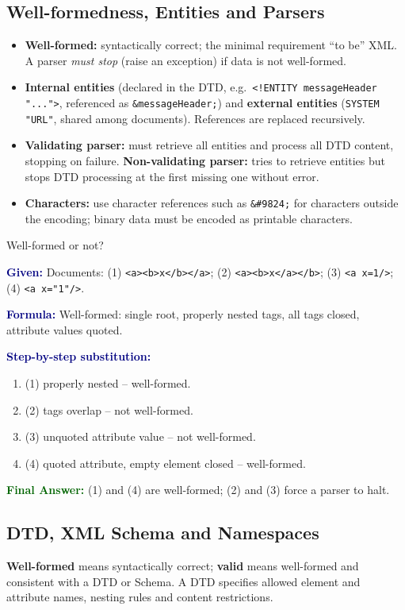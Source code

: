 \documentclass[11pt,a4paper,openany]{report}
\newcommand{\Given}{\par\textbf{\textcolor{navy}{Given:}} }
\newcommand{\Formula}{\par\textbf{\textcolor{navy}{Formula:}} }
\newcommand{\Steps}{\par\textbf{\textcolor{navy}{Step-by-step substitution:}}\par}
\newcommand{\Answer}{\par\textbf{\textcolor{darkgreen}{Final Answer:}} }
\begin{document}
\subsection{Well-formedness, Entities and Parsers}
\begin{itemize}[leftmargin=*]
  \item \textbf{Well-formed:} syntactically correct; the minimal requirement ``to be'' XML. A parser \emph{must stop}
        (raise an exception) if data is not well-formed.
  \item \textbf{Internal entities} (declared in the DTD, e.g.\ \verb|<!ENTITY messageHeader "...">|, referenced as
        \verb|&messageHeader;|) and \textbf{external entities} (\verb|SYSTEM "URL"|, shared among documents).
        References are replaced recursively.
  \item \textbf{Validating parser:} must retrieve all entities and process all DTD content, stopping on failure.
        \textbf{Non-validating parser:} tries to retrieve entities but stops DTD processing at the first missing
        one without error.
  \item \textbf{Characters:} use character references such as \verb|&#9824;| for characters outside the encoding;
        binary data must be encoded as printable characters.
\end{itemize}

\begin{solved}{Well-formed or not?}
\Given Documents: (1) \verb|<a><b>x</b></a>|; (2) \verb|<a><b>x</a></b>|; (3) \verb|<a x=1/>|; (4) \verb|<a x="1"/>|.
\Formula Well-formed: single root, properly nested tags, all tags closed, attribute values quoted.
\Steps
\begin{enumerate}[leftmargin=*]
  \item (1) properly nested -- well-formed.
  \item (2) tags overlap -- not well-formed.
  \item (3) unquoted attribute value -- not well-formed.
  \item (4) quoted attribute, empty element closed -- well-formed.
\end{enumerate}
\Answer (1) and (4) are well-formed; (2) and (3) force a parser to halt.
\end{solved}

\subsection{DTD, XML Schema and Namespaces}
\textbf{Well-formed} means syntactically correct; \textbf{valid} means well-formed and consistent with a DTD or Schema.
A DTD specifies allowed element and attribute names, nesting rules and content restrictions.
\end{document}
